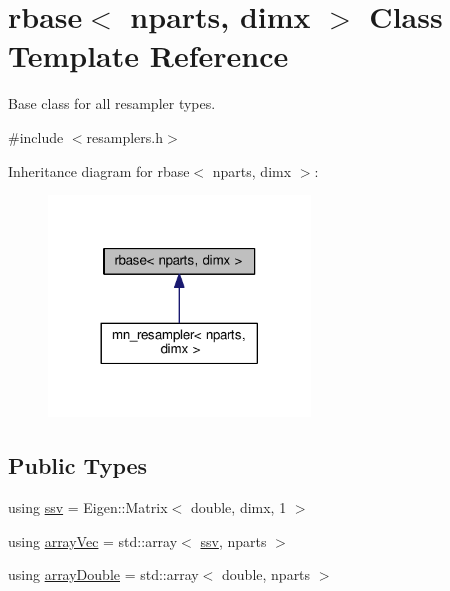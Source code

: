 \hypertarget{classrbase}{}\section{rbase$<$ nparts, dimx $>$ Class Template Reference}
\label{classrbase}


Base class for all resampler types.  




{\ttfamily \#include $<$resamplers.\+h$>$}



Inheritance diagram for rbase$<$ nparts, dimx $>$\+:\nopagebreak
\begin{figure}[H]
\begin{center}
\leavevmode
\includegraphics[width=197pt]{classrbase__inherit__graph}
\end{center}
\end{figure}
\subsection*{Public Types}
\begin{DoxyCompactItemize}
\item 
using \hyperlink{classrbase_a78cdecb1ac67ffdaee90be7709c961e4}{ssv} = Eigen\+::\+Matrix$<$ double, dimx, 1 $>$
\item 
using \hyperlink{classrbase_a428b9f0dd8712a93c096baaf6ab74d8c}{array\+Vec} = std\+::array$<$ \hyperlink{classrbase_a78cdecb1ac67ffdaee90be7709c961e4}{ssv}, nparts $>$
\item 
using \hyperlink{classrbase_ab1b61e00a2e0783d9b414118d912427e}{array\+Double} = std\+::array$<$ double, nparts $>$
\end{DoxyCompactItemize}
